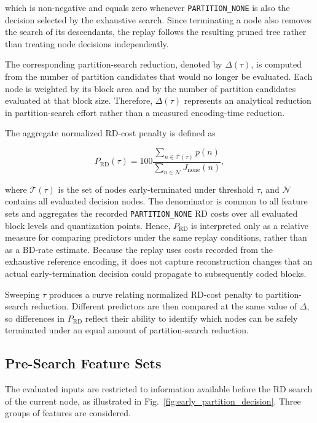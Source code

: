 \documentclass{article}
\begin{document}
which is non-negative and equals zero whenever \texttt{PARTITION\_NONE} is also the decision selected by the exhaustive search. Since terminating a node also removes the search of its descendants, the replay follows the resulting pruned tree rather than treating node decisions independently.

The corresponding partition-search reduction, denoted by $\Delta(\tau)$, is computed from the number of partition candidates that would no longer be evaluated. Each node is weighted by its block area and by the number of partition candidates evaluated at that block size. Therefore, $\Delta(\tau)$ represents an analytical reduction in partition-search effort rather than a measured encoding-time reduction.

The aggregate normalized RD-cost penalty is defined as

\begin{equation}
P_{\mathrm{RD}}(\tau)=
100
\frac{
\sum_{n\in\mathcal{T}(\tau)} p(n)
}{
\sum_{n\in\mathcal{N}} J_{\mathrm{none}}(n)
},
\end{equation}

where $\mathcal{T}(\tau)$ is the set of nodes early-terminated under threshold $\tau$, and $\mathcal{N}$ contains all evaluated decision nodes. The denominator is common to all feature sets and aggregates the recorded \texttt{PARTITION\_NONE} RD costs over all evaluated block levels and quantization points. Hence, $P_{\mathrm{RD}}$ is interpreted only as a relative measure for comparing predictors under the same replay conditions, rather than as a BD-rate estimate. Because the replay uses costs recorded from the exhaustive reference encoding, it does not capture reconstruction changes that an actual early-termination decision could propagate to subsequently coded blocks.

Sweeping $\tau$ produces a curve relating normalized RD-cost penalty to partition-search reduction. Different predictors are then compared at the same value of $\Delta$, so differences in $P_{\mathrm{RD}}$ reflect their ability to identify which nodes can be safely terminated under an equal amount of partition-search reduction.

\subsection{Pre-Search Feature Sets}

The evaluated inputs are restricted to information available before the RD search of the current node, as illustrated in Fig.~\ref{fig:early_partition_decision}. Three groups of features are considered.
\end{document}
